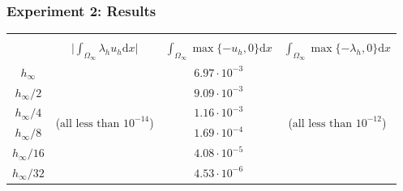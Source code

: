 \documentclass[aspectratio=169,xcolor=dvipsnames,11pt]{beamer}
\newcommand{\dd}{\mathrm{d}}
\begin{document}
\begin{frame}\frametitle{Experiment 2: Results}
\begin{table}
\centering
\small
\renewcommand{\arraystretch}{1.3}
\begin{tabular}{ |c|c|c|c| }
 \hline
 \rowcolor{lightgray!10}
  &&&
  \\
 \rowcolor{lightgray!10}
  \multirow{-2}{*}{$h$} & \multirow{-2}{3cm}{\centering {\small Complementarity} $\big|\int_{\Omega_\infty} \lambda_h u_h \dd x\big|$} & \multirow{-2}{3cm}{\centering {\small Primal feasibility} $\int_{\Omega_\infty} \max\{-u_h,0\} \dd x$} & \multirow{-2}{3cm}{\centering {\small Dual feasibility} $\int_{\Omega_\infty} \max\{-\lambda_h,0\} \dd x$}\\
 $h_\infty$     & \multirow{6}{*}{($\text{all less than~} 10^{-14}$)} & $6.97 \cdot 10^{-3}$ & \multirow{6}{*}{($\text{all less than~} 10^{-12}$)} \\
 $h_\infty/2$   &  & $9.09 \cdot 10^{-3}$ & \\
 $h_\infty/4$   &  & $1.16 \cdot 10^{-3}$ & \\
 $h_\infty/8$   &  & $1.69 \cdot 10^{-4}$ & \\
 $h_\infty/16$  &  & $4.08 \cdot 10^{-5}$ & \\
 $h_\infty/32$  &  & $4.53 \cdot 10^{-6}$ & \\
 \hline
\end{tabular}
\end{table}
\end{frame}
\end{document}
